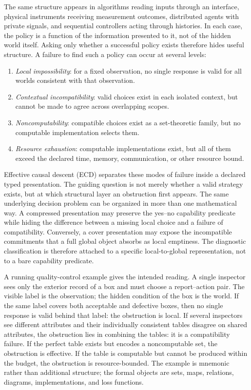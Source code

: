\documentclass[11pt]{article}
\theoremstyle{plain}
\theoremstyle{definition}
\theoremstyle{remark}
\begin{document}
The same structure appears in algorithms reading inputs through an interface,
physical instruments receiving measurement outcomes, distributed agents with
private signals, and sequential controllers acting through histories. In each
case, the policy is a function of the information presented to it, not of the
hidden world itself. Asking only whether a successful policy exists therefore
hides useful structure. A failure to find such a policy can occur at several
levels:
\begin{enumerate}[label=(\roman*)]
\item \emph{Local impossibility}: for a fixed observation, no single response is
valid for all worlds consistent with that observation.
\item \emph{Contextual incompatibility}: valid choices exist in each isolated
context, but cannot be made to agree across overlapping scopes.
\item \emph{Noncomputability}: compatible choices exist as a set-theoretic
family, but no computable implementation selects them.
\item \emph{Resource exhaustion}: computable implementations exist, but all of
them exceed the declared time, memory, communication, or other resource bound.
\end{enumerate}

Effective causal descent (ECD) separates these modes of failure inside a
declared typed presentation. The guiding question is not merely whether a valid
strategy exists, but at which structural layer an obstruction first appears. The
same underlying decision problem can be organized in more than one mathematical
way. A compressed presentation may preserve the yes--no capability predicate
while hiding the difference between a missing local choice and a failure of
compatibility. Conversely, a cover presentation may expose the incompatible
commitments that a full global object absorbs as local emptiness. The diagnostic
classification is therefore attached to a specific local-to-global
representation, not to a bare capability predicate.

A running quality-control example gives the intended reading. A single inspector
sees only the exterior record of a box and must choose a report--action pair. The
visible label is the observation; the hidden condition of the box is the world.
If the same label covers both acceptable and defective boxes, then no single
response is valid behind that label: the obstruction is local. If several
inspectors see different attributes and their individually consistent tables
disagree on shared attributes, the obstruction lies in combining the tables: it
is a compatibility failure. If the perfect table exists but encodes a
noncomputable set, the obstruction is effective. If the table is computable but
cannot be produced within the budget, the obstruction is resource-bounded. The
example is mnemonic rather than additional structure; the formal objects are
sets, maps, relations, diagrams, implementations, and loss functions.
\end{document}
